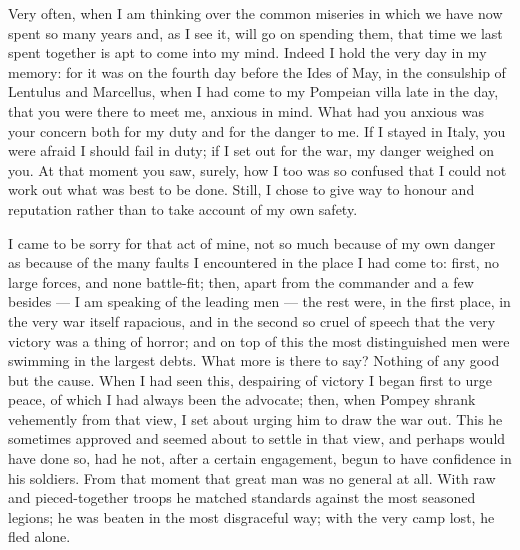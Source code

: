

 Very often, when I am thinking over the common miseries in which we have now spent so many years and, as I see it, will go on spending them, that time we last spent together is apt to come into my mind. Indeed I hold the very day in my memory: for it was on the fourth day before the Ides of May, in the consulship of Lentulus and Marcellus, when I had come to my Pompeian villa late in the day, that you were there to meet me, anxious in mind. What had you anxious was your concern both for my duty and for the danger to me. If I stayed in Italy, you were afraid I should fail in duty; if I set out for the war, my danger weighed on you. At that moment you saw, surely, how I too was so confused that I could not work out what was best to be done. Still, I chose to give way to honour and reputation rather than to take account of my own safety.

 I came to be sorry for that act of mine, not so much because of my own danger as because of the many faults I encountered in the place I had come to: first, no large forces, and none battle-fit; then, apart from the commander and a few besides --- I am speaking of the leading men --- the rest were, in the first place, in the very war itself rapacious, and in the second so cruel of speech that the very victory was a thing of horror; and on top of this the most distinguished men were swimming in the largest debts. What more is there to say? Nothing of any good but the cause. When I had seen this, despairing of victory I began first to urge peace, of which I had always been the advocate; then, when Pompey shrank vehemently from that view, I set about urging him to draw the war out. This he sometimes approved and seemed about to settle in that view, and perhaps would have done so, had he not, after a certain engagement, begun to have confidence in his soldiers. From that moment that great man was no general at all. With raw and pieced-together troops he matched standards against the most seasoned legions; he was beaten in the most disgraceful way; with the very camp lost, he fled alone.

